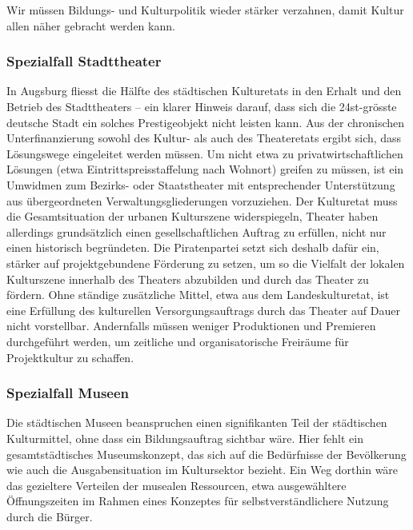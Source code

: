   Wir müssen Bildungs- und Kulturpolitik wieder stärker verzahnen, damit 
  Kultur allen näher gebracht werden kann.
  
  \subsubsection{Spezialfall Stadttheater}
  
  In Augsburg fliesst die Hälfte des städtischen Kulturetats in den Erhalt 
  und den Betrieb des Stadttheaters – ein klarer Hinweis darauf, dass sich 
  die 24st-grösste deutsche Stadt ein solches Prestigeobjekt nicht leisten 
  kann. Aus der chronischen Unterfinanzierung sowohl des Kultur- als auch des 
  Theateretats ergibt sich, dass Lösungswege eingeleitet werden müssen. Um nicht etwa zu 
  privatwirtschaftlichen Lösungen (etwa Eintrittspreisstaffelung nach 
  Wohnort) greifen zu müssen, ist ein Umwidmen zum Bezirks- oder 
  Staatstheater mit entsprechender Unterstützung aus übergeordneten 
  Verwaltungsgliederungen vorzuziehen. Der Kulturetat muss die 
  Gesamtsituation der urbanen Kulturszene widerspiegeln, Theater haben 
  allerdings grundsätzlich einen gesellschaftlichen Auftrag zu erfüllen, 
  nicht nur einen historisch begründeten. Die Piratenpartei setzt sich 
  deshalb dafür ein, stärker auf projektgebundene Förderung zu setzen, um so 
  die Vielfalt der lokalen Kulturszene innerhalb des Theaters abzubilden und 
  durch das Theater zu fördern. Ohne ständige zusätzliche Mittel, etwa aus 
  dem Landeskulturetat, ist eine Erfüllung des kulturellen 
  Versorgungsauftrags durch das Theater auf Dauer nicht vorstellbar. 
  Andernfalls müssen weniger Produktionen und Premieren durchgeführt werden, 
  um zeitliche und organisatorische Freiräume für Projektkultur zu schaffen.
  
  \subsubsection{Spezialfall Museen}
  
  Die städtischen Museen beanspruchen einen signifikanten Teil der 
  städtischen Kulturmittel, ohne dass ein Bildungsauftrag sichtbar wäre. Hier 
  fehlt ein gesamtstädtisches Museumskonzept, das sich auf die Bedürfnisse 
  der Bevölkerung wie auch die Ausgabensituation im Kultursektor bezieht. Ein 
  Weg dorthin wäre das gezieltere Verteilen der musealen Ressourcen, etwa 
  ausgewähltere Öffnungszeiten im Rahmen eines Konzeptes für 
  selbstverständlichere Nutzung durch die Bürger.
  
